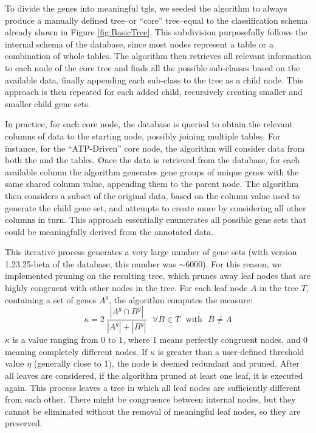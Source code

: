 To divide the genes into meaningful \glspl{tgl}, we seeded the algorithm to always produce a manually defined tree--or ``core'' tree--equal to the classification schema already shown in Figure \ref{fig:BasicTree}.
This subdivision purposefully follows the internal schema of the database, since most nodes represent a table or a combination of whole tables.
The algorithm then retrieves all relevant information to each node of the core tree and finds all the possible sub-classes based on the available data, finally appending each sub-class to the tree as a child node.
This approach is then repeated for each added child, recursively creating smaller and smaller child gene sets.

In practice, for each core node, the database is queried to obtain the relevant columns of data to the starting node, possibly joining multiple tables.
For instance, for the ``ATP-Driven'' core node, the algorithm will consider data from both the  and the  tables.
Once the data is retrieved from the database, for each available column the algorithm generates gene groups of unique genes with the same shared column value, appending them to the parent node.
The algorithm then considers a subset of the original data, based on the column value used to generate the child gene set, and attempts to create more by considering all other columns in turn.
This approach essentially enumerates all possible gene sets that could be
meaningfully derived from the annotated data.

This iterative process generates a very large number of gene sets (with version 1.23.25-beta of the database, this number was $\sim 6000$).
For this reason, we implemented pruning on the resulting tree, which prunes away leaf nodes that are highly congruent with other nodes in the tree.
For each leaf node $A$ in the tree $T$, containing a set of genes $A^g$, the algorithm computes the measure:
\begin{equation}
    \kappa = 2\ \frac{\left|A^g \cap B^g\right|}{\left|A^g\right|+\left|B^g\right|}
    \ \ \ \forall B \in T \ \ \ \text{with}\ \ \  B \neq A
    \label{eq:node_similarity}
\end{equation}
$\kappa$ is a value ranging from $0$ to $1$, where $1$ means perfectly congruent nodes, and $0$ meaning completely different nodes.
If $\kappa$ is greater than a user-defined threshold value $\eta$ (generally close to 1), the node is deemed redundant and pruned.
After all leaves are considered, if the algorithm pruned at least one leaf, it is executed again.
This process leaves a tree in which all leaf nodes are sufficiently different from each other.
There might be congruence between internal nodes, but they cannot be eliminated
without the removal of meaningful leaf nodes, so they are preserved.


